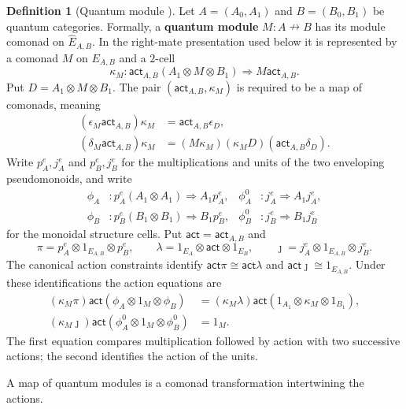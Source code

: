\documentclass[oneside]{article}
\newcommand{\xnrightarrow}[1]{\mathrel{\overset{#1}{\nrightarrow}}}
\newcommand{\act}{\mathsf{act}}
\theoremstyle{plain}
\theoremstyle{definition}
\newtheorem{definition}[theorem]{Definition}
\theoremstyle{remark}
\begin{document}
\begin{definition}[Quantum module {\cite[Defs.~3 and 7]{Chikhladze2010QuantumModules}}]
\label{def:cgqg-background-quantum-module}
Let \(A=(A_0,A_1)\) and \(B=(B_0,B_1)\) be quantum categories. Formally, a
\textbf{quantum module} \(M:A\xnrightarrow{}B\) has its module comonad on
\(\widehat E_{A,B}\). In the right-mate presentation used below it is represented
by a comonad \(M\) on \(E_{A,B}\) and a \(2\)-cell
\begin{equation}
 \kappa_M:
 \act_{A,B}(A_1\otimes M\otimes B_1)
 \Longrightarrow M \act_{A,B}.
 \label{eq:cgqg-background-quantum-module-direct-action}
\end{equation}
Put \(D=A_1\otimes M\otimes B_1\). The pair
\((\act_{A,B},\kappa_M)\) is required to be a map of comonads, meaning
\begin{align}
 (\epsilon_M \act_{A,B})\kappa_M
   &=\act_{A,B}\epsilon_D,
 \label{eq:cgqg-background-module-counit}\\
 (\delta_M \act_{A,B})\kappa_M
   &=(M\kappa_M)(\kappa_M D)(\act_{A,B}\delta_D).
 \label{eq:cgqg-background-module-comultiplication}
\end{align}
Write \(p_A^{e},j_A^{e}\) and \(p_B^{e},j_B^{e}\) for the multiplications and units
of the two enveloping pseudomonoids, and write
\[
\begin{aligned}
\phi_A &:p_A^{e}(A_1\otimes A_1)\Rightarrow A_1p_A^{e},
&\phi_A^0 &:j_A^{e}\Rightarrow A_1j_A^{e},\\
\phi_B &:p_B^{e}(B_1\otimes B_1)\Rightarrow B_1p_B^{e},
&\phi_B^0 &:j_B^{e}\Rightarrow B_1j_B^{e}
\end{aligned}
\]
for the monoidal structure cells. Put \(\act=\act_{A,B}\) and
\[
\pi=p_A^{e}\otimes1_{E_{A,B}}\otimes p_B^{e},\qquad
\lambda=1_{E_A}\otimes \act\otimes1_{E_B},\qquad
\jmath=j_A^{e}\otimes1_{E_{A,B}}\otimes j_B^{e}.
\]
The canonical action constraints identify \(\act\pi\cong \act\lambda\) and
\(\act\jmath\cong1_{E_{A,B}}\). Under these identifications the action equations are
\begin{align}
(\kappa_M\pi)\act(\phi_A\otimes1_M\otimes\phi_B)
 &=(\kappa_M\lambda)\act(1_{A_1}\otimes\kappa_M\otimes1_{B_1}),
 \label{eq:cgqg-background-module-associativity}\\
(\kappa_M\jmath)\act(\phi_A^0\otimes1_M\otimes\phi_B^0)
 &=1_M.
 \label{eq:cgqg-background-module-unit}
\end{align}
The first equation compares multiplication followed by action with two
successive actions; the second identifies the action of the units.

A map of quantum modules is a comonad transformation intertwining the actions.
\end{definition}
\end{document}
